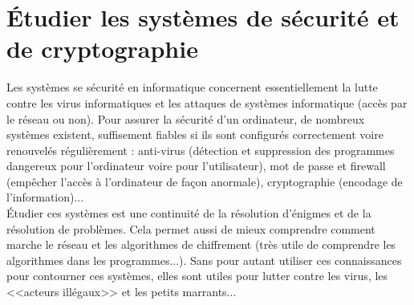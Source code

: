 \documentclass[11pt,twoside,a4paper]{article}
\begin{document}
\section{{\'E}tudier les syst{\`e}mes de s{\'e}curit{\'e} et de cryptographie}
		Les syst{\`e}mes se s{\'e}curit{\'e} en informatique concernent essentiellement la lutte contre les virus informatiques et les attaques de syst{\`e}mes informatique (acc{\`e}s par le r{\'e}seau ou non). Pour assurer la s{\'e}curit{\'e} d'un ordinateur, de nombreux syst{\`e}mes existent, suffisement fiables si ils sont configur{\'e}s correctement voire renouvel{\'e}s r{\'e}guli{\`e}rement : anti-virus (d{\'e}tection et suppression des programmes dangereux pour l'ordinateur voire pour l'utilisateur), mot de passe et firewall (emp{\^e}cher l'acc{\`e}s {\`a} l'ordinateur de fa\c{c}on anormale), cryptographie (encodage de l'information)...~\\

		{\'E}tudier ces syst{\`e}mes est une continuit{\'e} de la r{\'e}solution d'{\'e}nigmes et de la r{\'e}solution de probl{\`e}mes. Cela permet aussi de mieux comprendre comment marche le r{\'e}seau et les algorithmes de chiffrement (tr{\`e}s utile de comprendre les algorithmes dans les programmes...). Sans pour autant utiliser ces connaissances pour contourner ces syst{\`e}mes, elles sont utiles pour lutter contre les virus, les <<acteurs ill{\'e}gaux>> et les petits marrants...~\\

\clearpage
\end{document}

